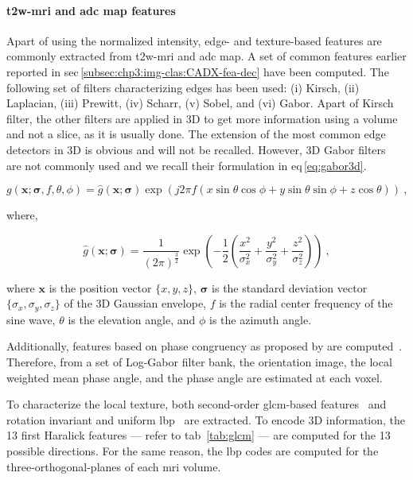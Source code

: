 \paragraph{\ac{t2w}-\ac{mri} and \ac{adc} map features}
Apart of using the normalized intensity, edge- and texture-based features are commonly extracted from \ac{t2w}-\ac{mri} and \ac{adc} map.
A set of common features earlier reported in \acs*{sec}\,\ref{subsec:chp3:img-clas:CADX-fea-dec} have been computed.
The following set of filters characterizing edges has been used: (i) Kirsch, (ii) Laplacian, (iii) Prewitt, (iv) Scharr, (v) Sobel, and (vi) Gabor.
Apart of Kirsch filter, the other filters are applied in 3D to get more information using a volume and not a slice, as it is usually done.
The extension of the most common edge detectors in 3D is obvious and will not be recalled.
However, 3D Gabor filters~\cite{wang2005face} are not commonly used and we recall their formulation in \acs*{eq}\,\eqref{eq:gabor3d}.

\begin{equation}
  g(\mathbf{x};\boldsymbol{\sigma},f,\theta,\phi) = \hat{g}(\mathbf{x};\boldsymbol{\sigma}) \exp(j 2 \pi f \left( x \sin \theta \cos \phi + y \sin \theta \sin \phi + z \cos \theta \right)) \ ,
  \label{eq:gabor3d}
\end{equation}

\noindent where,

\begin{equation}
  \hat{g}(\mathbf{x};\boldsymbol{\sigma}) = \frac{1}{{\left(2 \pi\right)}^{\frac{3}{2}}} \exp \left( -\frac{1}{2} \left( \frac{x^2}{\sigma_x^2} + \frac{y^2}{\sigma_y^2} + \frac{z^2}{\sigma_z^2} \right) \right) \ ,
  \label{eq:gabor3dgaussian}
\end{equation}

\noindent where $\mathbf{x}$ is the position vector $\{x,y,z\}$, $\boldsymbol{\sigma}$ is the standard deviation vector $\{\sigma_x,\sigma_y,\sigma_z\}$ of the 3D Gaussian envelope, $f$ is the radial center frequency of the sine wave, $\theta$ is the elevation angle, and $\phi$ is the azimuth angle.

Additionally, features based on phase congruency as proposed by \citeauthor{kovesi1999image} are computed~\cite{kovesi1999image}.
Therefore, from a set of Log-Gabor filter bank, the orientation image, the local weighted mean phase angle, and the phase angle are estimated at each voxel.

To characterize the local texture, both second-order \ac{glcm}-based features~\cite{Haralick1973} and rotation invariant and uniform \ac{lbp}~\cite{ojala2002multiresolution} are extracted.
To encode 3D information, the 13 first Haralick features --- refer to \acs{tab}~\ref{tab:glcm} --- are computed for the 13 possible directions.
For the same reason, the \ac{lbp} codes are computed for the three-orthogonal-planes of each \ac{mri} volume.

